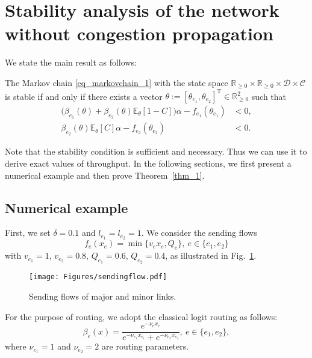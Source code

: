 \section{Stability analysis of the network without congestion propagation}
\label{sec_stability}


We state the main result as follows:
\begin{thm}
\label{thm_1}
The Markov chain \eqref{eq_markovchain_1} with the state space $\mathbb{R}_{\geq0}\times\mathbb{R}_{\geq0}\times\mathcal{D}\times\mathcal{C}$ is stable if and only if there exists a vector $\theta:=[\theta_{e_1},\theta_{e_2}]^{\mathrm{T}}\in\mathbb{R}_{\geq0}^2$ such that
\begin{subequations}
    \begin{align}
        \Big(\beta_{e_1}(\theta) + \beta_{e_2}(\theta)\mathbb{E}_\theta[1-C]\Big)\alpha -f_{e_1}(\theta_{e_1}) &< 0, \label{eq_thm1_1} \\
        \beta_{e_2}(\theta)\mathbb{E}_\theta[C]\alpha  -f_{e_2}(\theta_{e_2}) &< 0. \label{eq_thm1_2}
    \end{align}
\end{subequations}
\end{thm}

Note that the stability condition is sufficient and necessary. Thus we can use it to derive exact values of throughput. In the following sections, we first present a numerical example and then prove Theorem~\ref{thm_1}.

\subsection{Numerical example}
\label{sec_num_inf}

First, we set $\delta = 0.1$ and  $l_{e_1}=l_{e_2}=1$. We consider the sending flows 
\begin{equation}
    f_e(x_e) = \min\{v_ex_e, Q_e\}, ~e\in\{e_1,e_2\} \label{eq_sending}
\end{equation}
with $v_{e_1}=1$, $v_{e_2}=0.8$, $Q_{e_1}=0.6$, $Q_{e_2}=0.4$, as illustrated in Fig.~\ref{fig_sendingflow}.

\begin{figure}[htbp]
    \centering
    \texttt{[image: Figures/sendingflow.pdf]}
    \caption{Sending flows of major and minor links.}
    \label{fig_sendingflow}
\end{figure}

For the purpose of routing, we adopt the classical logit routing as follows:
\begin{equation}
     \beta_e(x) = \frac{e^{-\nu_e x_e}}{e^{-\nu_{e_1}x_{e_1}}+e^{-\nu_{e_2}x_{e_2}}}, ~e\in\{e_1,e_2\},
\end{equation}
where $\nu_{e_1}=1$ and $\nu_{e_2}=2$ are routing parameters. 

